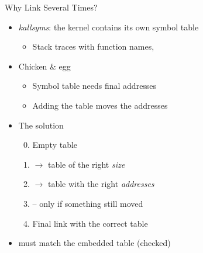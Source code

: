 \begin{frame}{Why Link  Several Times?}

  \begin{itemize}[<+->]
    \item \emph{kallsyms}: the kernel contains its own symbol table
      \begin{itemize}[<.->]
	\item Stack traces with function names, 
      \end{itemize}
    \item Chicken \& egg
      \begin{itemize}[<.->]
	\item Symbol table needs final addresses
	\item Adding the table moves the addresses
      \end{itemize}
    \item The solution
      \begin{enumerate}[<.->]
	\setcounter{enumi}{-1}
	\item Empty table
	\item {} $\rightarrow$ table of the right \emph{size}
	\item {} $\rightarrow$ table with the right \emph{addresses}
	\item {} -- only if something still moved
	\item Final link with the correct table
      \end{enumerate}
    \item {} must match the embedded table (checked)
  \end{itemize}

\end{frame}


